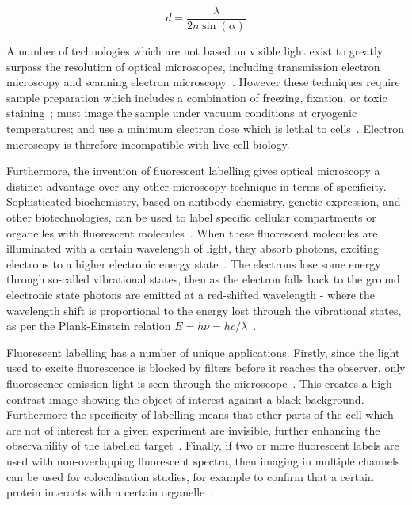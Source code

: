 \begin{equation} \label{eq:abbe}
d = \frac{\lambda}{2n\sin\left (\alpha  \right )}\end{equation}

A number of technologies which are not based on visible light exist to greatly surpass the resolution of optical microscopes, including transmission electron microscopy and scanning electron microscopy~\cite{reinhold1931configuration, wells2006early, reimer2013transmission}.
However these techniques require sample preparation which includes a combination of freezing, fixation, or toxic staining~\cite{kuo2007electron}; must image the sample under vacuum conditions at cryogenic temperatures; and use a minimum electron dose which is lethal to cells~\cite{de2016live}. 
Electron microscopy is therefore incompatible with live cell biology.

Furthermore, the invention of fluorescent labelling gives optical microscopy a distinct advantage over any other microscopy technique in terms of specificity. 
Sophisticated biochemistry, based on antibody chemistry, genetic expression, and other biotechnologies, can be used to label specific cellular compartments or organelles with fluorescent molecules~\cite{day2014fluorescent}. 
When these fluorescent molecules are illuminated with a certain wavelength of light, they absorb photons, exciting electrons to a higher electronic energy state~\cite[\textit{ch. 1}]{lakowicz2007principles}. 
The electrons lose some energy through so-called vibrational states, then as the electron falls back to the ground electronic state photons are emitted at a red-shifted wavelength - where the wavelength shift is proportional to the energy lost through the vibrational states, as per the Plank-Einstein relation $E=h\nu=hc/\lambda$~\cite[\textit{ch. 39}]{halliday2010principles}. 

Fluorescent labelling has a number of unique applications. 
Firstly, since the light used to excite fluorescence is blocked by filters before it reaches the observer, only fluorescence emission light is seen through the microscope~\cite{ploem1967use}. 
This creates a high-contrast image showing the object of interest against a black background. 
Furthermore the specificity of labelling means that other parts of the cell which are not of interest for a given experiment are invisible, further enhancing the observability of the labelled target~\cite{day2014fluorescent}.
Finally, if two or more fluorescent labels are used with non-overlapping fluorescent spectra, then imaging in multiple channels can be used for colocalisation studies, for example to confirm that a certain protein interacts with a certain organelle~\cite{dunn2011practical}. 

